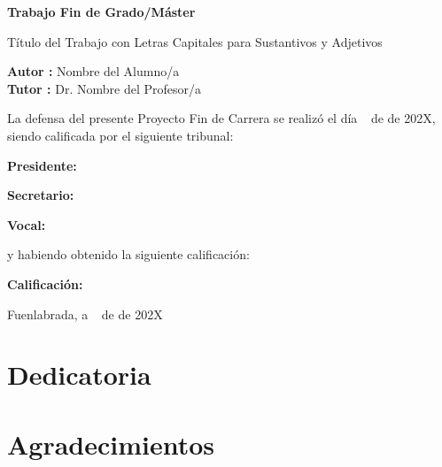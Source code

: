 \documentclass[a4paper, 11pt]{book}
\begin{document}
\vspace{-4cm}
\begin{center}
\LARGE
\textbf{Trabajo Fin de Grado/Máster}

\vspace{1cm}
\large
Título del Trabajo con Letras Capitales para Sustantivos y Adjetivos

\vspace{1cm}
\large
\textbf{Autor :} Nombre del Alumno/a \\
\textbf{Tutor :} Dr. Nombre del Profesor/a

\end{center}

\vspace{1cm}
La defensa del presente Proyecto Fin de Carrera se realizó el día \qquad$\;\,$ de \qquad\qquad\qquad\qquad \newline de 202X, siendo calificada por el siguiente tribunal:


\vspace{0.5cm}
\textbf{Presidente:}

\vspace{1.2cm}
\textbf{Secretario:}

\vspace{1.2cm}
\textbf{Vocal:}


\vspace{1.2cm}
y habiendo obtenido la siguiente calificación:

\vspace{1cm}
\textbf{Calificación:}


\vspace{1cm}
\begin{flushright}
Fuenlabrada, a \qquad$\;\,$ de \qquad\qquad\qquad\qquad de 202X
\end{flushright}


\chapter*{Dedicatoria}



\chapter*{Agradecimientos}
\end{document}
